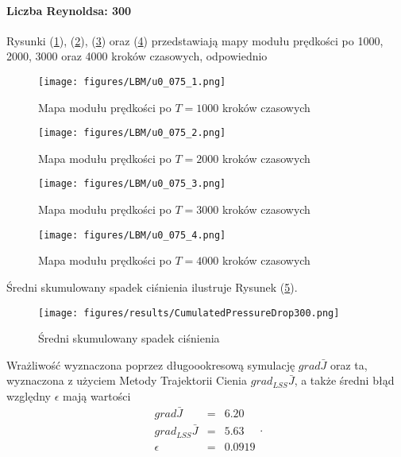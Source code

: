 \documentclass[12pt]{article}
\begin{document}
\paragraph{Liczba Reynoldsa: 300}
Rysunki (\ref{Fig36}), (\ref{Fig37}), (\ref{Fig38}) oraz (\ref{Fig39}) przedstawiają mapy modułu prędkości po 1000, 2000, 3000 oraz 4000 kroków czasowych, odpowiednio 
\begin{figure}[H]
	\texttt{[image: figures/LBM/u0\_075\_1.png]} 
	\caption{Mapa modułu prędkości po $ T=1000 $ kroków czasowych}
	\label{Fig36}
\end{figure}
\begin{figure}[H]
	\texttt{[image: figures/LBM/u0\_075\_2.png]} 
	\caption{Mapa modułu prędkości po $ T=2000 $ kroków czasowych}
	\label{Fig37}
\end{figure}
\begin{figure}[H]
	\texttt{[image: figures/LBM/u0\_075\_3.png]} 
	\caption{Mapa modułu prędkości po $ T=3000 $ kroków czasowych}
	\label{Fig38}
\end{figure}
\begin{figure}[H]
	\texttt{[image: figures/LBM/u0\_075\_4.png]} 
	\caption{Mapa modułu prędkości po $ T=4000 $ kroków czasowych}
	\label{Fig39}
\end{figure}
Średni skumulowany spadek ciśnienia ilustruje Rysunek (\ref{Fig40}).
\begin{figure}[H]
	\texttt{[image: figures/results/CumulatedPressureDrop300.png]} 
	\centering
	\caption{Średni skumulowany spadek ciśnienia}
	\label{Fig40}
\end{figure}
Wrażliwość wyznaczona poprzez długoookresową symulację $ grad\bar{J} $ oraz ta, wyznaczona z użyciem Metody Trajektorii Cienia $ grad_{LSS}\bar{J} $, a także średni błąd względny $ \epsilon $ mają wartości
\begin{equation}
\begin{array}{rcl}
grad\bar{J} &=& 6.20\\
grad_{LSS}\bar{J} &=& 5.63 \\
\epsilon &=& 0.0919
\end{array} .
\label{results300}
\end{equation}
\end{document}
